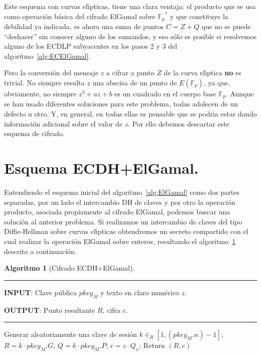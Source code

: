 \documentclass{llncs}
\def\ce{curva{} el\'{\i}ptica}%
\def\ces{curvas{} el\'{\i}pticas}%
\newcommand{\Fp}{\ensuremath{\mathbb{F}_p}}%
\theoremstyle{plain}        			%
\theoremstyle{definition}   			%
\theoremstyle{saltolinea}   			%
\newtheorem{algo}{Algoritmo}
\begin{document}
Este esquema con \ces{}, tiene una clara ventaja: el producto que se usa como operaci\'on b\'asica del cifrado ElGamal sobre $\Fp^*$ y que constituye la debilidad ya indicada, es ahora una suma de puntos $C=Z+Q$ que no se puede ``deshacer'' sin conocer alguno de los sumandos, y eso s\'olo es posible si resolvemos alguno de los ECDLP subyacentes en los pasos 2 y 3 del algoritmo~\ref{alg:ECElGamal}.

Pero la conversi\'on del mensaje $z$ a cifrar a punto $Z$ de la \ce{} {\bf no} es trivial. No siempre resulta $z$ una abscisa de un punto de $E(\Fp)$, ya que, obviamente, no siempre $z^3+az+b$ es un cuadrado en el cuerpo base $\Fp$. Aunque se han usado diferentes soluciones para este problema, todas adolecen de un defecto u otro. Y, en general, en todas ellas es pensable que se podr\'{\i}a estar dando informaci\'on adicional sobre el valor de $z$. Por ello debemos descartar este esquema de cifrado.

\section{Esquema ECDH+ElGamal.}

Entendiendo el esquema inicial del algoritmo~\ref{alg:ElGamal} como dos partes separadas, por un lado el intercambio DH de claves y por otro la operaci\'on producto, asociada propiamente al cifrado ElGamal, podemos buscar una soluci\'on al anterior problema. Si realizamos un intercambio de claves del tipo Diffie-Hellman sobre \ces{} obtendremos un secreto compartido con el cual realizar la operaci\'on ElGamal sobre enteros, resultando el algoritmo~\ref{alg:ECDH} descrito a continuaci\'on.

\begin{algo}[Cifrado ECDH+ElGamal]\label{alg:ECDH}
\parbox[b]{\linewidth}{%
\hrule
\smallskip
{\bf INPUT}: Clave p\'ublica $pkey_{M}$ y texto en claro num\'erico $z$.

{\bf OUTPUT}: Punto resultante $R$, cifra $c$.
\vspace{1.5mm}
\hrule
}%
\begin{algorithmic}[1]
\STATE Generar aleatoriamente una clave de sesi\'on $k\in_{R}\left[1,\left(pkey_{M}.n\right)-1\right]$;
\STATE $R=k\cdot pkey_{M}.G$;
\STATE $Q=k\cdot pkey_{M}.P$; 
\STATE $c=z\cdot Q_x$; 
\STATE Return $(R,c)$
\end{algorithmic}
\end{algo}
\end{document}
